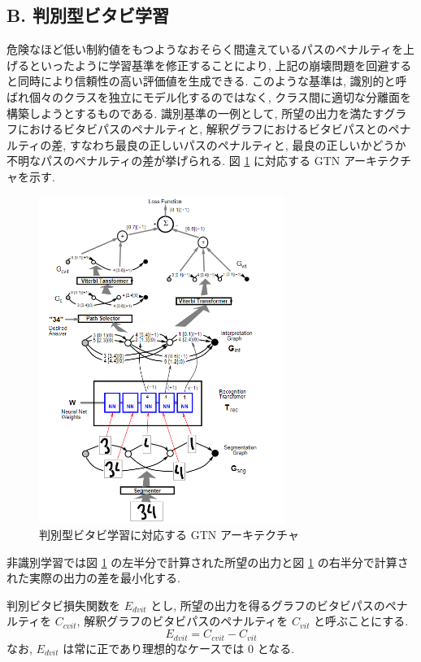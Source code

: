 \documentclass[twocolumn]{jarticle}     %
\begin{document}
\subsection*{B. 判別型ビタビ学習}
危険なほど低い制約値をもつようなおそらく間違えているパスのペナルティを上げるといったように学習基準を修正することにより, 上記の崩壊問題を回避すると同時により信頼性の高い評価値を生成できる. このような基準は, 識別的と呼ばれ個々のクラスを独立にモデル化するのではなく, クラス間に適切な分離面を構築しようとするものである. 識別基準の一例として, 所望の出力を満たすグラフにおけるビタビパスのペナルティと, 解釈グラフにおけるビタビパスとのペナルティの差, すなわち最良の正しいパスのペナルティと, 最良の正しいかどうか不明なパスのペナルティの差が挙げられる. 図 \ref{fig:20} に対応する GTN アーキテクチャを示す.
\begin{figure}[t]
  \centering
  \includegraphics[width=80mm]{assets/20.png}
  \caption{判別型ビタビ学習に対応する GTN アーキテクチャ}
  \label{fig:20}
\end{figure} 
非識別学習では図 \ref{fig:20} の左半分で計算された所望の出力と図 \ref{fig:20} の右半分で計算された実際の出力の差を最小化する.
\par
判別ビタビ損失関数を $E_{dvit}$ とし, 所望の出力を得るグラフのビタビパスのペナルティを $C_{cvit}$, 解釈グラフのビタビパスのペナルティを $C_{vit}$ と呼ぶことにする.
\begin{equation}
  E_{dvit} = C_{cvit} - C_{vit}
\end{equation} 
なお, $E_{dvit}$ は常に正であり理想的なケースでは 0 となる. 
\par
\end{document}

